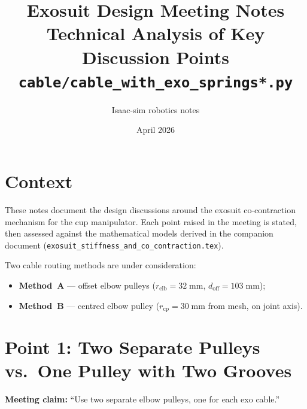 \documentclass[11pt, a4paper]{article}
\title{\textbf{Exosuit Design Meeting Notes}\\
       \large Technical Analysis of Key Discussion Points\\[4pt]
       \normalsize \texttt{cable/cable\_with\_exo\_springs*.py}}
\date{April 2026}
\author{Isaac-sim robotics notes}
\begin{document}
\maketitle

\section{Context}

These notes document the design discussions around the exosuit
co-contraction mechanism for the cup manipulator.  Each point raised in the
meeting is stated, then assessed against the mathematical models derived in
the companion document
(\texttt{exosuit\_stiffness\_and\_co\_contraction.tex}).

\medskip\noindent
Two cable routing methods are under consideration:
\begin{itemize}[nosep]
  \item \textbf{Method~A} --- offset elbow pulleys
    ($r_{\text{elb}} = 32\;\text{mm}$, $d_{\text{off}} = 103\;\text{mm}$);
  \item \textbf{Method~B} --- centred elbow pulley
    ($r_{\text{cp}} = 30\;\text{mm}$ from mesh, on joint axis).
\end{itemize}


\section{Point 1: Two Separate Pulleys vs.\ One Pulley with Two Grooves}
\label{sec:point1}

\noindent
\textbf{Meeting claim:} ``Use two separate elbow pulleys, one for each exo
cable.''
\end{document}
